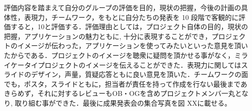 評価内容を踏まえて自分のグループの評価を目的，現状の把握，今後の計画の具体性，表現力，チームワーク，をもとに自分たちの発表を 10 段階で客観的に評価すると，10と評価する．評価理由としては，プロジェクト自体の目的，現状の把握，アプリケーションの魅力ともに, 十分に表現することができ，プロジェクトのイメージが伝わった，アプリケーションを使ってみたいといった意見を頂いたからである．プロジェクトのイメージを聴衆に疑問を頂かせる事がなく，ミライケータイプロジェクトのイメージを伝えることができた．表現力に関してはスライドのデザイン，声量，質疑応答ともに良い意見を頂いた．チームワークの面でも，ポスタ，スライドともに，担当者が責任を持って作成を行ない最後まであきらめず，それに対するレビューもOB・OGを含めプロジェクトメンバ一丸となり, 取り組む事ができた．最後に成果発表会の集合写真を図 XXに載せる。

